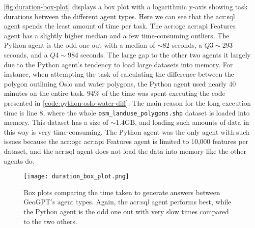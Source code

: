 \autoref{fig:duration-box-plot} displays a box plot with a logarithmic y-axis showing task durations between the different agent types. Here we can see that the \acrshort{acr:sql} agent spends the least amount of time per task. The \acrshort{acr:ogc} \acrshort{acr:api} Features agent has a slightly higher median and a few time-consuming outliers. The Python agent is the odd one out with a median of $\sim 82$ seconds, a $Q3 \sim 293$ seconds, and a $Q4 \sim 984$ seconds. The large gap to the other two agents it largely due to the Python agent's tendency to load large datasets into memory. For instance, when attempting the task of calculating the difference between the polygon outlining Oslo and water polygons, the Python agent used nearly 40 minutes on the entire task. $94\%$ of the time was spent executing the code presented in \autoref{code:python-oslo-water-diff}. The main reason for the long execution time is line 8, where the whole \texttt{osm\_landuse\_polygons.shp} dataset is loaded into memory. This dataset has a size of $\sim 1.4 \text{GB}$, and loading such amounts of data in this way is very time-consuming. The Python agent was the only agent with such issues because the \acrshort{acr:ogc} \acrshort{acr:api} Features agent is limited to 10,000 features per dataset, and the \acrshort{acr:sql} agent does not load the data into memory like the other agents do.

\begin{figure}[htbp]
    \centering
    \texttt{[image: duration\_box\_plot.png]}
    \caption[Box plots comparing the time taken to generate answers between GeoGPT's agent types]{Box plots comparing the time taken to generate answers between GeoGPT's agent types. Again, the \acrshort{acr:sql} agent performs best, while the Python agent is the odd one out with very slow times compared to the two others.}
    \label{fig:duration-box-plot}
\end{figure}

\FloatBarrier

